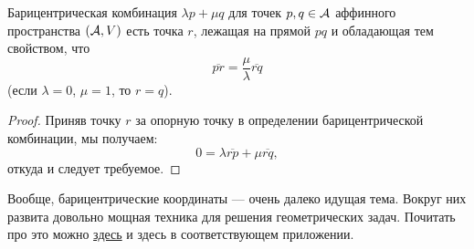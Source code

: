 \begin{proposal}
    Барицентрическая комбинация $\lambda p + \mu q$ для точек $p, q \in \mathcal{A}$ аффинного пространства $(\mathcal{A}, V)$ есть точка $r$, лежащая на прямой $pq$ и обладающая тем свойством, что
    \[
        \overline{pr} = \frac{\mu}{\lambda}\overline{rq}
    \]
    (если $\lambda = 0$, $\mu = 1$, то $r = q$).
\end{proposal}

\begin{proof}
    Приняв точку $r$ за опорную точку в определении барицентрической комбинации, мы получаем:
    \[
        0 = \lambda\overline{rp} + \mu\overline{rq},
    \]
    откуда и следует требуемое.
\end{proof}

Вообще, барицентрические координаты --- очень далеко идущая тема. Вокруг них развита довольно мощная техника для решения геометрических задач. Почитать про это можно \href{https://old.mccme.ru//mmmf-lectures//books/books/book.40.pdf}{здесь} и здесь в соответствующем приложении.

